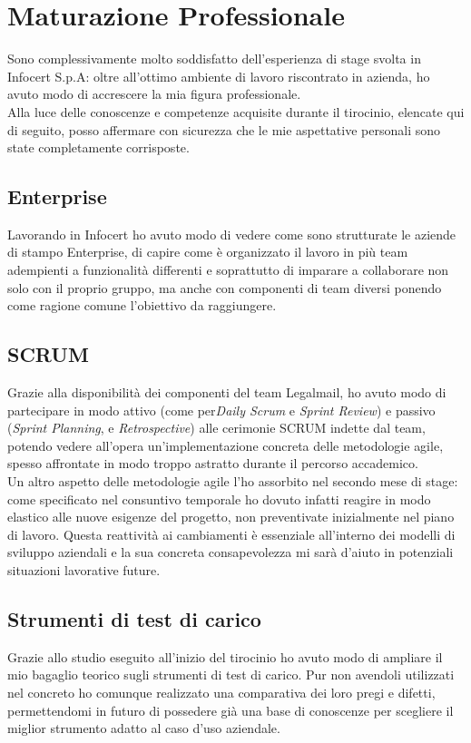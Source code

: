 \section{Maturazione Professionale}
Sono complessivamente molto soddisfatto dell'esperienza di stage svolta in Infocert S.p.A: oltre all'ottimo ambiente di lavoro riscontrato in azienda, ho avuto modo di accrescere la mia figura professionale. \\
Alla luce delle conoscenze e competenze acquisite durante il tirocinio, elencate qui di seguito, posso affermare con sicurezza che le mie aspettative personali sono state completamente corrisposte. 
\subsection{Enterprise}
Lavorando in Infocert ho avuto modo di vedere come sono strutturate le aziende di stampo Enterprise, di capire come è organizzato il lavoro in più team adempienti a funzionalità differenti e soprattutto di imparare a collaborare non solo con il proprio gruppo, ma anche con componenti di team diversi ponendo come ragione comune l'obiettivo da raggiungere.
\subsection{SCRUM}
Grazie alla disponibilità dei componenti del team Legalmail, ho avuto modo di partecipare in modo attivo (come per\textit{Daily Scrum} e \textit{Sprint Review}) e passivo (\textit{Sprint Planning}, e \textit{Retrospective}) alle cerimonie SCRUM indette dal team, potendo vedere all'opera un'implementazione concreta delle metodologie \gls{agile}, spesso affrontate in modo troppo astratto durante il percorso accademico.\\
Un altro aspetto delle metodologie \gls{agile} l'ho assorbito nel secondo mese di stage: come specificato nel consuntivo temporale ho dovuto infatti reagire in modo elastico alle nuove esigenze del progetto, non preventivate inizialmente nel piano di lavoro. Questa reattività ai cambiamenti è essenziale all'interno dei modelli di sviluppo aziendali e la sua concreta consapevolezza mi sarà d'aiuto in potenziali situazioni lavorative future.
\subsection{Strumenti di test di carico}
Grazie allo studio eseguito all'inizio del tirocinio ho avuto modo di ampliare il mio bagaglio teorico sugli strumenti di test di carico. Pur non avendoli utilizzati nel concreto ho comunque realizzato una comparativa dei loro pregi e difetti, permettendomi in futuro di possedere già una base di conoscenze per scegliere il miglior strumento adatto al caso d'uso aziendale.
